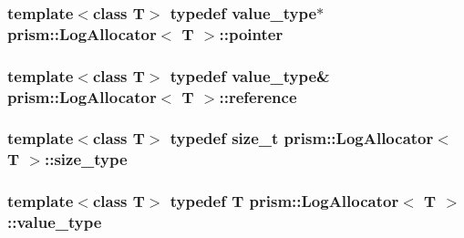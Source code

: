 \subsubsection[{\texorpdfstring{pointer}{pointer}}]{\setlength{\rightskip}{0pt plus 5cm}template$<$class T$>$ typedef {\bf value\+\_\+type}$\ast$ {\bf prism\+::\+Log\+Allocator}$<$ T $>$\+::{\bf pointer}}\hypertarget{classprism_1_1_log_allocator_aa95e52dd075368ba542af3da925e6c16}{}\label{classprism_1_1_log_allocator_aa95e52dd075368ba542af3da925e6c16}
\subsubsection[{\texorpdfstring{reference}{reference}}]{\setlength{\rightskip}{0pt plus 5cm}template$<$class T$>$ typedef {\bf value\+\_\+type}\& {\bf prism\+::\+Log\+Allocator}$<$ T $>$\+::{\bf reference}}\hypertarget{classprism_1_1_log_allocator_a736d959fa8370b20de2bac647b3ddf8c}{}\label{classprism_1_1_log_allocator_a736d959fa8370b20de2bac647b3ddf8c}
\subsubsection[{\texorpdfstring{size\+\_\+type}{size_type}}]{\setlength{\rightskip}{0pt plus 5cm}template$<$class T$>$ typedef size\+\_\+t {\bf prism\+::\+Log\+Allocator}$<$ T $>$\+::{\bf size\+\_\+type}}\hypertarget{classprism_1_1_log_allocator_a23a86945109072959b47b6becda9925f}{}\label{classprism_1_1_log_allocator_a23a86945109072959b47b6becda9925f}
\subsubsection[{\texorpdfstring{value\+\_\+type}{value_type}}]{\setlength{\rightskip}{0pt plus 5cm}template$<$class T$>$ typedef T {\bf prism\+::\+Log\+Allocator}$<$ T $>$\+::{\bf value\+\_\+type}}\hypertarget{classprism_1_1_log_allocator_a84ee349868301d14e91f9876bbf2de27}{}\label{classprism_1_1_log_allocator_a84ee349868301d14e91f9876bbf2de27}



